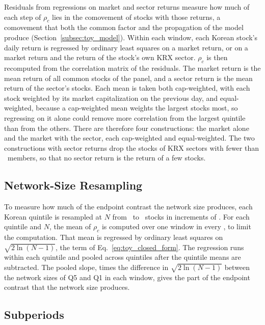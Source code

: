 \documentclass[a4paper,fleqn]{cas-sc}
\begin{document}
Residuals from regressions on market and sector returns measure how much of each step of $\rho_c$ lies in the comovement of stocks with those returns, a comovement that both the common factor and the propagation of the model produce (Section~\ref{subsec:toy_model}). Within each window, each Korean stock's daily return is regressed by ordinary least squares on a market return, or on a market return and the return of the stock's own KRX sector. $\rho_c$ is then recomputed from the correlation matrix of the residuals. The market return is the mean return of all common stocks of the panel, and a sector return is the mean return of the sector's stocks. Each mean is taken both cap-weighted, with each stock weighted by its market capitalization on the previous day, and equal-weighted, because a cap-weighted mean weights the largest stocks most, so regressing on it alone could remove more correlation from the largest quintile than from the others. There are therefore four constructions: the market alone and the market with the sector, each cap-weighted and equal-weighted. The two constructions with sector returns drop the stocks of KRX sectors with fewer than \minSectorSize\ members, so that no sector return is the return of a few stocks.

\subsection{Network-Size Resampling}\label{subsec:resampling_method}

To measure how much of the endpoint contrast the network size produces, each Korean quintile is resampled at $N$ from \networkSizeNMin\ to \networkSizeNMax\ stocks in increments of \networkSizeNStep. For each quintile and $N$, the mean of $\rho_c$ is computed over one window in every \networkSizeWindowStride, to limit the computation. That mean is regressed by ordinary least squares on $\sqrt{2\ln(N-1)}$, the term of Eq.~\eqref{eq:toy_closed_form}. The regression runs within each quintile and pooled across quintiles after the quintile means are subtracted. The pooled slope, times the difference in $\sqrt{2\ln(N-1)}$ between the network sizes of Q5 and Q1 in each window, gives the part of the endpoint contrast that the network size produces.

\subsection{Subperiods}\label{subsec:time_method}
\end{document}
